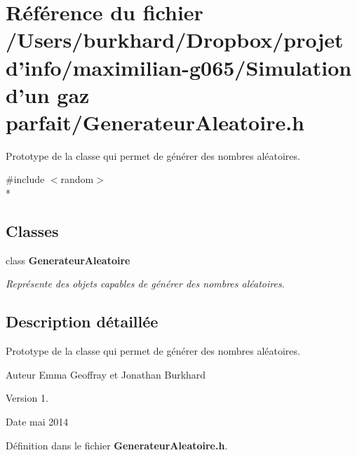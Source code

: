 \section{Référence du fichier /\+Users/burkhard/\+Dropbox/projet d'info/maximilian-\/g065/\+Simulation d'un gaz parfait/\+Generateur\+Aleatoire.h}
\label{_generateur_aleatoire_8h}


Prototype de la classe qui permet de générer des nombres aléatoires.  


{\ttfamily \#include $<$random$>$}\\*
\subsection*{Classes}
\begin{DoxyCompactItemize}
\item 
class {\bf Generateur\+Aleatoire}
\begin{DoxyCompactList}\small\item\em Représente des objets capables de générer des nombres aléatoires. \end{DoxyCompactList}\end{DoxyCompactItemize}


\subsection{Description détaillée}
Prototype de la classe qui permet de générer des nombres aléatoires. 

\begin{DoxyAuthor}{Auteur}
Emma Geoffray et Jonathan Burkhard 
\end{DoxyAuthor}
\begin{DoxyVersion}{Version}
1. 
\end{DoxyVersion}
\begin{DoxyDate}{Date}
mai 2014 
\end{DoxyDate}


Définition dans le fichier {\bf Generateur\+Aleatoire.\+h}.

